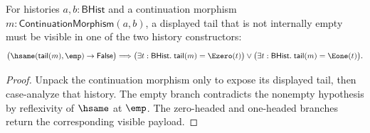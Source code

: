\begin{theorem}
\label{thm:continuation-morphism-tail-nonempty-shape-cases}
For histories $a,b:\mathsf{BHist}$ and a continuation morphism
$m:\mathsf{ContinuationMorphism}(a,b)$, a displayed tail that is not internally
empty must be visible in one of the two history constructors:
$$
\bigl(\hsame(\mathsf{tail}(m),\emp)\to\mathsf{False}\bigr)
\Longrightarrow
\bigl(\exists t:\mathsf{BHist}.\;\mathsf{tail}(m)=\Ezero(t)\bigr)\vee
\bigl(\exists t:\mathsf{BHist}.\;\mathsf{tail}(m)=\Eone(t)\bigr).
$$
\end{theorem}
\begin{proof}
Unpack the continuation morphism only to expose its displayed tail, then
case-analyze that history. The empty branch contradicts the nonempty
hypothesis by reflexivity of $\hsame$ at $\emp$. The zero-headed and one-headed
branches return the corresponding visible payload.
\end{proof}
